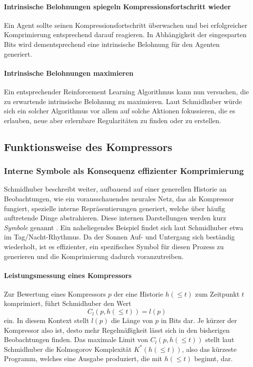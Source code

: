 \paragraph{Intrinsische Belohnungen spiegeln Kompressionsfortschritt wieder}
Ein Agent sollte seinen Kompressionsfortschritt überwachen und bei erfolgreicher Komprimierung entsprechend darauf reagieren. In Abhängigkeit der eingesparten Bits wird dementsprechend eine intrinsische Belohnung für den Agenten generiert.

\paragraph{Intrinsische Belohnungen maximieren}
Ein entsprechender Reinforcement Learning Algorithmus kann nun versuchen, die zu erwartende intrinsische Belohnung zu maximieren. Laut Schmidhuber würde sich ein solcher Algorithmus vor allem auf solche Aktionen fokussieren, die es erlauben, neue aber erlernbare Regularitäten zu finden oder zu erstellen.

\subsection{Funktionsweise des Kompressors}
\label{sec:Kompressor}
\subsubsection{Interne Symbole als Konsequenz effizienter Komprimierung}
Schmidhuber beschreibt weiter, aufbauend auf einer generellen Historie an Beobachtungen, wie ein vorausschauendes neurales Netz, das als Kompressor fungiert, spezielle interne Repräsentierungen generiert, welche über häufig auftretende Dinge abstrahieren. Diese internen Darstellungen werden kurz \emph{Symbole} genannt \cite[p.~6]{curiosity_schmidhuber}. Ein naheliegendes Beispiel findet sich laut Schmidhuber etwa im Tag/Nacht-Rhythmus. Da der Sonnen Auf- und Untergang sich beständig wiederholt, ist es effizienter, ein spezifisches Symbol für diesen Prozess zu generieren und die Komprimierung dadurch voranzutreiben.


\paragraph{Leistungsmessung eines Kompressors}
Zur Bewertung eines Kompressors \(p\) der eine Historie \(h(\leq t)\) zum Zeitpunkt \(t\) komprimiert, führt Schmidhuber den Wert 
\begin{equation}
  C_l(p,h(\leq t)) = l(p)  
\end{equation}
ein. In diesem Kontext stellt \(l(p)\) die Länge von \(p\) in Bits dar. Je kürzer der Kompressor also ist, desto mehr Regelmäßigkeit lässt sich in den bisherigen Beobachtungen finden. \cite[p.~19]{curiosity_schmidhuber}
Das maximale Limit von \(C_l(p,h(\leq t))\) stellt laut Schmidhuber die Kolmogorov Komplexität \(K^*(h(\leq t))\), also das kürzeste Programm, welches eine Ausgabe produziert, die mit \(h(\leq t)\) beginnt, dar.

